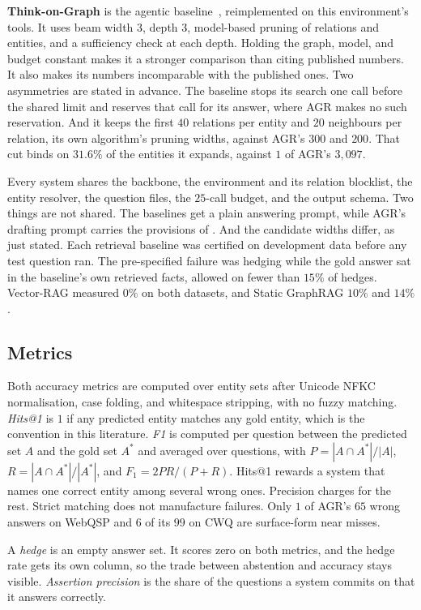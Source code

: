 \textbf{Think-on-Graph} is the agentic baseline~\cite{sun2024think},
reimplemented on this environment's tools. It uses beam width $3$, depth $3$,
model-based pruning of relations and entities, and a sufficiency check at each
depth. Holding the graph, model, and budget constant makes it a stronger
comparison than citing published numbers. It also makes its numbers incomparable
with the published ones. Two asymmetries are stated in advance. The baseline
stops its search one call before the shared limit and reserves that call for its
answer, where AGR makes no such reservation. And it keeps the first $40$
relations per entity and $20$ neighbours per relation, its own algorithm's
pruning widths, against AGR's $300$ and $200$. That cut binds on $31.6\%$ of the
entities it expands, against $1$ of AGR's $3{,}097$.

Every system shares the backbone, the environment and its relation blocklist,
the entity resolver, the question files, the $25$-call budget, and the output
schema. Two things are not shared. The baselines get a plain answering prompt,
while AGR's drafting prompt carries the provisions of .
And the candidate widths differ, as just stated. Each retrieval baseline was
certified on development data before any test question ran. The pre-specified
failure was hedging while the gold answer sat in the baseline's own retrieved
facts, allowed on fewer than $15\%$ of hedges. Vector-RAG measured $0\%$ on both
datasets, and Static GraphRAG $10\%$ and $14\%$.

\subsection{Metrics}\label{sec:metrics}

Both accuracy metrics are computed over entity sets after Unicode NFKC
normalisation, case folding, and whitespace stripping, with no fuzzy matching.
\emph{Hits@1} is $1$ if any predicted entity matches any gold entity, which is
the convention in this literature. \emph{F1} is computed per question between
the predicted set $A$ and the gold set $A^{*}$ and averaged over questions, with
$P = |A \cap A^{*}| / |A|$, $R = |A \cap A^{*}| / |A^{*}|$, and $F_1 =
2PR/(P+R)$. Hits@1 rewards a system that names one correct entity among several
wrong ones. Precision charges for the rest. Strict matching does not manufacture
failures. Only $1$ of AGR's $65$ wrong answers on WebQSP and $6$ of its $99$ on
CWQ are surface-form near misses.

A \emph{hedge} is an empty answer set. It scores zero on both metrics, and the
hedge rate gets its own column, so the trade between abstention and accuracy
stays visible. \emph{Assertion precision} is the share of the questions a system
commits on that it answers correctly.


